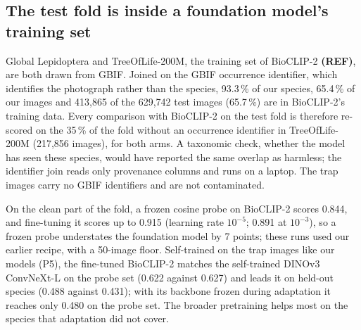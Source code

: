\subsection{The test fold is inside a foundation model's training set}\label{sec:results_contamination}
Global Lepidoptera and TreeOfLife-200M, the training set of BioCLIP-2 \textbf{(REF)}, are both drawn from GBIF.
Joined on the GBIF occurrence identifier, which identifies the photograph rather than the species, 93.3\,\% of our species, 65.4\,\% of our images and 413,865 of the 629,742 test images (65.7\,\%) are in BioCLIP-2's training data.
Every comparison with BioCLIP-2 on the test fold is therefore re-scored on the 35\,\% of the fold without an occurrence identifier in TreeOfLife-200M (217,856 images), for both arms.
A taxonomic check, whether the model has seen these species, would have reported the same overlap as harmless; the identifier join reads only provenance columns and runs on a laptop.
The trap images carry no GBIF identifiers and are not contaminated.

On the clean part of the fold, a frozen cosine probe on BioCLIP-2 scores 0.844, and fine-tuning it scores up to 0.915 (learning rate $10^{-5}$; 0.891 at $10^{-3}$), so a frozen probe understates the foundation model by 7 points; these runs used our earlier recipe, with a 50-image floor.
Self-trained on the trap images like our models (P5), the fine-tuned BioCLIP-2 matches the self-trained DINOv3 ConvNeXt-L on the probe set (0.622 against 0.627) and leads it on held-out species (0.488 against 0.431); with its backbone frozen during adaptation it reaches only 0.480 on the probe set.
The broader pretraining helps most on the species that adaptation did not cover.
